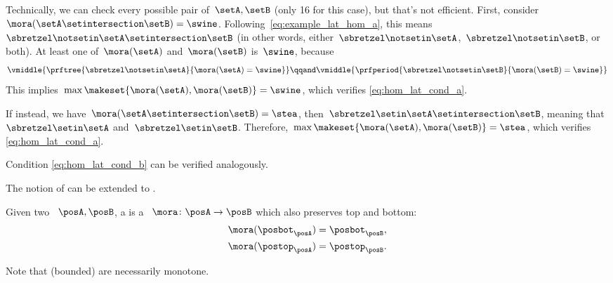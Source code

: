 \begin{example}
    Technically, we can check every possible pair of~$\setA,\setB$ (only 16 for this case), but that's not efficient.
    First, consider~$\mora(\setA\setintersection \setB)=\swine$.
    Following~\cref{eq:example_lat_hom_a}, this means~$\sbretzel \notsetin \setA\setintersection \setB$ (in other words, either~$\sbretzel \notsetin \setA$,~$\sbretzel \notsetin \setB$, or both).
    At least one of~$\mora(\setA)$ and~$\mora(\setB)$ is~$\swine$, because
    \begin{equation}
        \vmiddle{
            \prftree{
                \sbretzel \notsetin \setA
            }{
                \mora(\setA) = \swine
            }
        }
        \qqand
        \vmiddle{
            \prfperiod{
                \sbretzel \notsetin \setB
            }{
                \mora(\setB) = \swine
            }
        }
    \end{equation}
    This implies~$\max\makeset{\mora(\setA),\mora(\setB)}=\swine$, which verifies \cref{eq:hom_lat_cond_a}.

    If instead, we have~$\mora(\setA\setintersection \setB)=\stea$, then~$\sbretzel \setin \setA\setintersection \setB$, meaning that~$\sbretzel \setin \setA$ and~$\sbretzel \setin \setB$.
    Therefore,~$\max\makeset{ \mora(\setA),\mora(\setB)}=\stea$, which verifies \cref{eq:hom_lat_cond_a}.

    Condition \cref{eq:hom_lat_cond_b} can be verified analogously.
\end{example}

The notion of  can be extended to .

\begin{ctdefinition}
    \label{def:bounded-lattice-homomorphism}
    Given two ~$\posA,\posB$, a  is a ~$\mora\colon \posA\to \posB$ which also preserves top and bottom:
    \begin{equation}
        \begin{aligned}
            \mora(\posbot_\posA) & =\posbot_\posB, \\
            \mora(\postop_\posA) & =\postop_\posB.
        \end{aligned}
    \end{equation}
\end{ctdefinition}

Note that (bounded)  are necessarily monotone.

